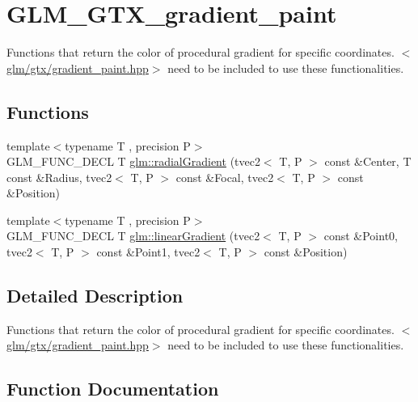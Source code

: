 \hypertarget{group__gtx__gradient__paint}{}\section{G\+L\+M\+\_\+\+G\+T\+X\+\_\+gradient\+\_\+paint}
\label{group__gtx__gradient__paint}


Functions that return the color of procedural gradient for specific coordinates. $<$\hyperlink{gradient__paint_8hpp}{glm/gtx/gradient\+\_\+paint.\+hpp}$>$ need to be included to use these functionalities.  


\subsection*{Functions}
\begin{DoxyCompactItemize}
\item 
{\footnotesize template$<$typename T , precision P$>$ }\\G\+L\+M\+\_\+\+F\+U\+N\+C\+\_\+\+D\+E\+C\+L T \hyperlink{group__gtx__gradient__paint_ga166d43d567a4cf150579a92f69b0dc9f}{glm\+::radial\+Gradient} (tvec2$<$ T, P $>$ const \&Center, T const \&Radius, tvec2$<$ T, P $>$ const \&Focal, tvec2$<$ T, P $>$ const \&Position)
\item 
{\footnotesize template$<$typename T , precision P$>$ }\\G\+L\+M\+\_\+\+F\+U\+N\+C\+\_\+\+D\+E\+C\+L T \hyperlink{group__gtx__gradient__paint_gacde26d5e0c4a1856467bded9dfad9040}{glm\+::linear\+Gradient} (tvec2$<$ T, P $>$ const \&Point0, tvec2$<$ T, P $>$ const \&Point1, tvec2$<$ T, P $>$ const \&Position)
\end{DoxyCompactItemize}


\subsection{Detailed Description}
Functions that return the color of procedural gradient for specific coordinates. $<$\hyperlink{gradient__paint_8hpp}{glm/gtx/gradient\+\_\+paint.\+hpp}$>$ need to be included to use these functionalities. 



\subsection{Function Documentation}
\hypertarget{group__gtx__gradient__paint_gacde26d5e0c4a1856467bded9dfad9040}{}
